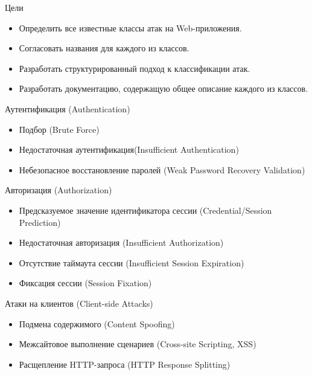 \begin{frame}{Цели}
	\begin{itemize}
		\item Определить все известные классы атак на Web-приложения.
		\item Согласовать названия для каждого из классов.
		\item Разработать структурированный подход к классификации  атак.
		\item Разработать документацию,  содержащую общее описание каждого из классов.
	\end{itemize}
\end{frame}


\begin{frame}{Аутентификация (Authentication)}
	\begin{itemize}
		\item Подбор (Brute Force) 
		\item Недостаточная аутентификация(Insufficient Authentication)
		\item Небезопасное восстановление паролей (Weak Password Recovery Validation)
	\end{itemize}

\end{frame}


\begin{frame}{Авторизация (Authorization)}
	\begin{itemize}
		\item Предсказуемое значение идентификатора сессии (Credential/Session Prediction)
		\item Недостаточная авторизация (Insufficient Authorization)
		\item Отсутствие таймаута сессии (Insufficient Session Expiration)
		\item Фиксация сессии (Session Fixation)
	\end{itemize}

\end{frame}


\begin{frame}{Атаки на клиентов (Client-side Attacks)}
	\begin{itemize}
		\item Подмена содержимого (Content Spoofing)
		\item Межсайтовое выполнение сценариев (Cross-site Scripting,  XSS)
		\item Расщепление HTTP-запроса (HTTP Response Splitting)
	\end{itemize}

\end{frame}


